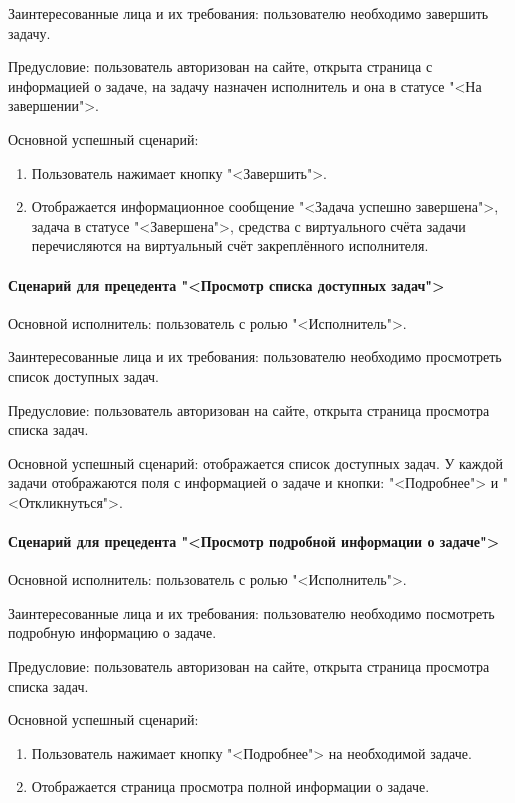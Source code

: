 Заинтересованные лица и их требования: пользователю необходимо завершить задачу.

Предусловие: пользователь авторизован на сайте, открыта страница с информацией о задаче, на задачу назначен исполнитель и она в статусе "<На завершении">.

Основной успешный сценарий: 

\begin{enumerate}
	\item Пользователь нажимает кнопку "<Завершить">. 
	\item Отображается информационное сообщение "<Задача успешно завершена">, задача в статусе "<Завершена">, средства с виртуального счёта задачи перечисляются на виртуальный счёт закреплённого исполнителя.
\end{enumerate}

\paragraph{Сценарий для прецедента "<Просмотр списка доступных задач">}

Основной исполнитель: пользователь с ролью "<Исполнитель">.

Заинтересованные лица и их требования: пользователю необходимо просмотреть список доступных задач.

Предусловие: пользователь авторизован на сайте, открыта страница просмотра списка задач.

Основной успешный сценарий: отображается список доступных задач. У каждой задачи отображаются поля с информацией о задаче и кнопки: "<Подробнее"> и "<Откликнуться">.

\paragraph{Сценарий для прецедента "<Просмотр подробной информации о задаче">}

Основной исполнитель: пользователь с ролью "<Исполнитель">.

Заинтересованные лица и их требования: пользователю необходимо посмотреть подробную информацию о задаче.

Предусловие: пользователь авторизован на сайте, открыта страница просмотра списка задач.

Основной успешный сценарий:

\begin{enumerate}
	\item Пользователь нажимает кнопку "<Подробнее"> на необходимой задаче. 
	\item Отображается страница просмотра полной информации о задаче.
\end{enumerate}

